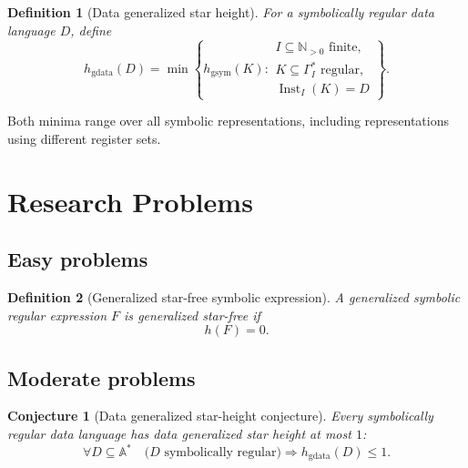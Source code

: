 \documentclass[11pt]{article}
\newtheorem{definition}{Definition}
\newtheorem{conjecture}{Conjecture}
\begin{document}
\begin{definition}[Data generalized star height]
For a symbolically regular data language $D$, define
\[
 h_{\mathrm{gdata}}(D)=
 \min\left\{
 h_{\mathrm{gsym}}(K):
 \begin{array}{l}
 I\subseteq\mathbb N_{>0}\text{ finite},\\
 K\subseteq\Gamma_I^*\text{ regular},\\
 \operatorname{Inst}_I(K)=D
 \end{array}
 \right\}.
\]
\end{definition}

Both minima range over all symbolic representations, including
representations using different register sets.

\section{Research Problems }

\subsection{Easy problems}






\begin{definition}[Generalized star-free symbolic expression]
A generalized symbolic regular expression $F$ is
\emph{generalized star-free} if
\[
  h(F)=0.
\]
\end{definition}







\subsection{Moderate problems}

\begin{conjecture}[Data generalized star-height conjecture]
Every symbolically regular data language has data generalized star height at
most $1$:
\[
 \forall D\subseteq\mathbb A^*\quad
 \bigl(D\text{ symbolically regular}\bigr)
 \Longrightarrow h_{\mathrm{gdata}}(D)\leq1.
\]
\end{conjecture}
\end{document}

